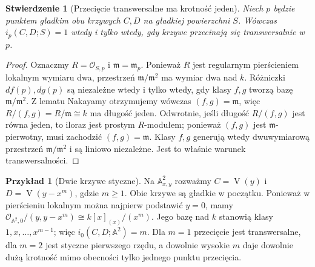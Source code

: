 \documentclass[11pt,a4paper,openany]{report}
\numberwithin{equation}{section}
\theoremstyle{plain}
\newtheorem{stwierdzenie}[twierdzenie]{Stwierdzenie}
\theoremstyle{definition}
\newtheorem{przyklad}[twierdzenie]{Przykład}
\theoremstyle{remark}
\newcommand{\A}{\mathbb A}
\newcommand{\V}{\operatorname V}
\begin{document}
\begin{stwierdzenie}[Przecięcie transwersalne ma krotność jeden]
\label{st:ga6-transversal-one}
Niech $p$ będzie punktem gładkim obu krzywych $C,D$ na
gładkiej powierzchni $S$. Wówczas $i_p(C,D;S)=1$ wtedy
i tylko wtedy, gdy krzywe przecinają się transwersalnie w $p$.
\end{stwierdzenie}
\begin{proof}
Oznaczmy $R=\mathcal O_{S,p}$ i $\mathfrak m=\mathfrak m_p$.
Ponieważ $R$ jest regularnym pierścieniem lokalnym wymiaru dwa,
przestrzeń $\mathfrak m/\mathfrak m^2$ ma wymiar dwa nad $k$.
Różniczki $df(p),dg(p)$ są niezależne wtedy i tylko wtedy,
gdy klasy $f,g$ tworzą bazę $\mathfrak m/\mathfrak m^2$.
Z lematu Nakayamy otrzymujemy wówczas $(f,g)=\mathfrak m$,
więc $R/(f,g)=R/\mathfrak m\cong k$ ma długość jeden.
Odwrotnie, jeśli długość $R/(f,g)$ jest równa jeden,
to iloraz jest prostym $R$-modułem; ponieważ $(f,g)$ jest
$\mathfrak m$-pierwotny, musi zachodzić $(f,g)=\mathfrak m$.
Klasy $f,g$ generują wtedy dwuwymiarową przestrzeń
$\mathfrak m/\mathfrak m^2$ i są liniowo niezależne.
Jest to właśnie warunek transwersalności.
\end{proof}

\begin{przyklad}[Dwie krzywe styczne]
\label{prz:ga6-tangent}
Na $\A^2_{x,y}$ rozważmy $C=\V(y)$ i $D=\V(y-x^m)$,
gdzie $m\ge1$. Obie krzywe są gładkie w początku.
Ponieważ w pierścieniu lokalnym można najpierw podstawić
$y=0$, mamy
$\mathcal O_{\A^2,0}/(y,y-x^m)\cong k[x]_{(x)}/(x^m)$.
Jego bazę nad $k$ stanowią klasy $1,x,\ldots,x^{m-1}$;
więc $i_0(C,D;\A^2)=m$. Dla $m=1$ przecięcie jest
transwersalne, dla $m=2$ jest styczne pierwszego rzędu,
a dowolnie wysokie $m$ daje dowolnie dużą krotność mimo
obecności tylko jednego punktu przecięcia.
\end{przyklad}
\end{document}
